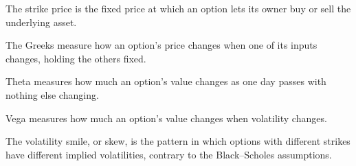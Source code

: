 \begin{keyterms}
\begin{description}[leftmargin=0pt, itemsep=0pt, parsep=0pt, topsep=0pt, font=\normalfont\bfseries\color{FEMaroon}]
  \item[Strike price.] The strike price is the fixed price at which an option lets its owner buy or sell the underlying asset.
  \item[The Greeks.] The Greeks measure how an option's price changes when one of its inputs changes, holding the others fixed.
  \item[Theta.] Theta measures how much an option's value changes as one day passes with nothing else changing.
  \item[Vega.] Vega measures how much an option's value changes when volatility changes.
  \item[Volatility smile and skew.] The volatility smile, or skew, is the pattern in which options with different strikes have different implied volatilities, contrary to the Black--Scholes assumptions.
\end{description}
\end{keyterms}
